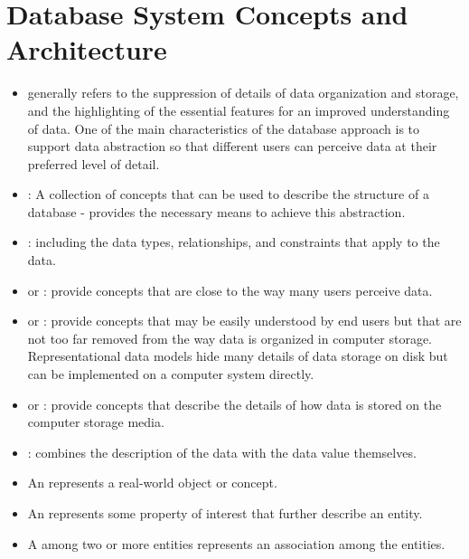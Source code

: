 \chapter{Database System Concepts and Architecture}

  \begin{itemize}
    \item {} generally refers to the suppression of details
      of data organization and storage, and the highlighting of the essential
      features for an improved understanding of data. One of the main
      characteristics of the database approach is to support data abstraction
      so that different users can perceive data at their preferred level of
      detail.
    \item {}: A collection of concepts that can be used to
      describe the structure of a database - provides the necessary means to
      achieve this abstraction.
    \item {}: including the data types,
      relationships, and constraints that apply to the data.
  \end{itemize}

    \begin{itemize}
      \item {} or : provide concepts
        that are close to the way many users perceive data.
      \item {} or : provide
        concepts that may be easily understood by end users but that are not
        too far removed from the way data is organized in computer storage.
        Representational data models hide many details of data storage on disk
        but can be implemented on a computer system directly.
      \item {} or : provide concepts that
        describe the details of how data is stored on the computer storage
        media.
      \item {}: combines the description of the
        data with the data value themselves.
    \end{itemize}

      \begin{itemize}
        \item An  represents a real-world object or concept.
        \item An  represents some property of interest that
          further describe an entity.
        \item A  among two or more entities represents an
          association among the entities.
      \end{itemize}


